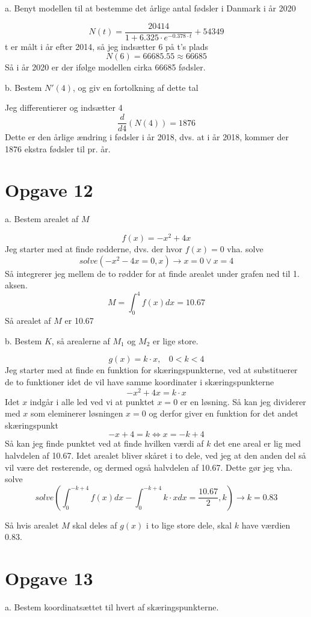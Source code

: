 \documentclass[12pt]{article}
\begin{document}
a. Benyt modellen til at bestemme det årlige antal fødsler i Danmark i år 2020

$$N(t) = \frac{20414}{1+6.325\cdot e^{-0.378\cdot t}}+54349$$
t er målt i år efter 2014, så jeg indsætter 6 på t's plads
$$N(6) = 66685.55 \approx 66685$$
Så i år 2020 er der ifølge modellen cirka 66685 fødsler.

b. Bestem $N'(4)$, og giv en fortolkning af dette tal

Jeg differentierer og indsætter 4
$$\frac{d}{d4}(N(4)) = 1876$$
Dette er den årlige ændring i fødsler i år 2018, dvs. at i år 2018, kommer der 1876 ekstra fødsler til pr. år.

\section*{Opgave 12}

a. Bestem arealet af $M$

$$f(x) = -x^2+4x$$
Jeg starter med at finde rødderne, dvs. der hvor $f(x) = 0$ vha. solve
$$solve(-x^2-4x = 0, x) \rightarrow x=0 \vee x=4$$
Så integrerer jeg mellem de to rødder for at finde arealet under grafen ned til 1. aksen.
$$M = \int_0^4 f(x) dx = 10.67$$
Så arealet af $M$ er 10.67

b. Bestem $K$, så arealerne af $M_1$ og $M_2$ er lige store.

$$g(x) = k\cdot x,~~~~0<k<4$$
Jeg starter med at finde en funktion for skæringspunkterne, ved at substituerer de to funktioner idet de vil have samme koordinater i skæringspunkterne
$$-x^2+4x=k\cdot x$$
Idet $x$ indgår i alle led ved vi at punktet $x = 0$ er en løsning. Så kan jeg dividerer med $x$ som eleminerer løsningen $x = 0$
og derfor giver en funktion for det andet skæringspunkt
$$-x+4 = k \Leftrightarrow x = -k+4$$
Så kan jeg finde punktet ved at finde hvilken værdi af $k$ det ene areal er lig med halvdelen af 10.67. Idet
arealet bliver skåret i to dele, ved jeg at den anden del så vil være det resterende, og dermed også halvdelen af 10.67.
Dette gør jeg vha. solve
$$solve \left( \int_0^{-k+4} f(x) dx-\int_0^{-k+4} k\cdot x dx = \frac{10.67}{2},k \right) \rightarrow k = 0.83$$

Så hvis arealet $M$ skal deles af $g(x)$ i to lige store dele, skal $k$ have værdien 0.83.

\section*{Opgave 13}

a. Bestem koordinatsættet til hvert af skæringspunkterne.
\end{document}
